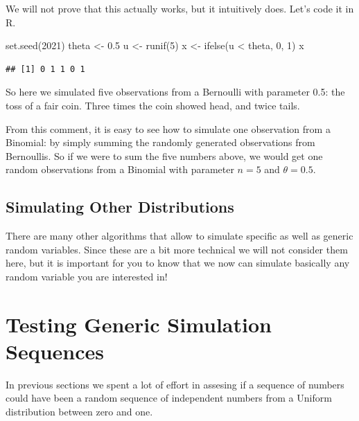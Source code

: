 \documentclass[
]{book}
\newenvironment{Shaded}{\begin{snugshade}}{\end{snugshade}}
\newcommand{\DecValTok}[1]{\textcolor[rgb]{0.00,0.00,0.81}{#1}}
\newcommand{\FloatTok}[1]{\textcolor[rgb]{0.00,0.00,0.81}{#1}}
\newcommand{\FunctionTok}[1]{\textcolor[rgb]{0.00,0.00,0.00}{#1}}
\newcommand{\NormalTok}[1]{#1}
\newcommand{\OtherTok}[1]{\textcolor[rgb]{0.56,0.35,0.01}{#1}}
\newcommand{\SpecialCharTok}[1]{\textcolor[rgb]{0.00,0.00,0.00}{#1}}
\theoremstyle{definition}
\theoremstyle{definition}
\theoremstyle{definition}
\theoremstyle{definition}
\theoremstyle{remark}
\begin{document}
We will not prove that this actually works, but it intuitively does. Let's code it in R.

\begin{Shaded}
\begin{Highlighting}[]
\FunctionTok{set.seed}\NormalTok{(}\DecValTok{2021}\NormalTok{)}
\NormalTok{theta }\OtherTok{\textless{}{-}} \FloatTok{0.5}
\NormalTok{u }\OtherTok{\textless{}{-}} \FunctionTok{runif}\NormalTok{(}\DecValTok{5}\NormalTok{)}
\NormalTok{x }\OtherTok{\textless{}{-}} \FunctionTok{ifelse}\NormalTok{(u }\SpecialCharTok{\textless{}}\NormalTok{ theta, }\DecValTok{0}\NormalTok{, }\DecValTok{1}\NormalTok{)}
\NormalTok{x}
\end{Highlighting}
\end{Shaded}

\begin{verbatim}
## [1] 0 1 1 0 1
\end{verbatim}

So here we simulated five observations from a Bernoulli with parameter 0.5: the toss of a fair coin. Three times the coin showed head, and twice tails.

From this comment, it is easy to see how to simulate one observation from a Binomial: by simply summing the randomly generated observations from Bernoullis. So if we were to sum the five numbers above, we would get one random observations from a Binomial with parameter \(n=5\) and \(\theta=0.5\).

\hypertarget{simulating-other-distributions}{%
\subsection{Simulating Other Distributions}\label{simulating-other-distributions}}

There are many other algorithms that allow to simulate specific as well as generic random variables. Since these are a bit more technical we will not consider them here, but it is important for you to know that we now can simulate basically any random variable you are interested in!

\hypertarget{testing-generic-simulation-sequences}{%
\section{Testing Generic Simulation Sequences}\label{testing-generic-simulation-sequences}}

In previous sections we spent a lot of effort in assesing if a sequence of numbers could have been a random sequence of independent numbers from a Uniform distribution between zero and one.
\end{document}
